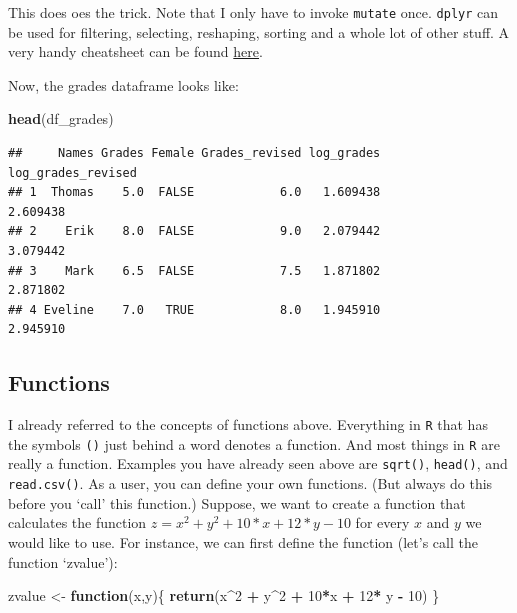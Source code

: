 \documentclass[]{article}
\newenvironment{Shaded}{\begin{snugshade}}{\end{snugshade}}
\newcommand{\KeywordTok}[1]{\textcolor[rgb]{0.13,0.29,0.53}{\textbf{#1}}}
\newcommand{\DecValTok}[1]{\textcolor[rgb]{0.00,0.00,0.81}{#1}}
\newcommand{\StringTok}[1]{\textcolor[rgb]{0.31,0.60,0.02}{#1}}
\newcommand{\ControlFlowTok}[1]{\textcolor[rgb]{0.13,0.29,0.53}{\textbf{#1}}}
\newcommand{\OperatorTok}[1]{\textcolor[rgb]{0.81,0.36,0.00}{\textbf{#1}}}
\newcommand{\NormalTok}[1]{#1}
\theoremstyle{definition}
\theoremstyle{definition}
\theoremstyle{definition}
\theoremstyle{remark}
\begin{document}
This does oes the trick. Note that I only have to invoke \texttt{mutate}
once. \texttt{dplyr} can be used for filtering, selecting, reshaping,
sorting and a whole lot of other stuff. A very handy cheatsheet can be
found
\href{https://www.rstudio.com/wp-content/uploads/2015/02/data-wrangling-cheatsheet.pdf}{here}.

Now, the grades dataframe looks like:

\begin{Shaded}
\begin{Highlighting}[]
\KeywordTok{head}\NormalTok{(df_grades)}
\end{Highlighting}
\end{Shaded}

\begin{verbatim}
##     Names Grades Female Grades_revised log_grades log_grades_revised
## 1  Thomas    5.0  FALSE            6.0   1.609438           2.609438
## 2    Erik    8.0  FALSE            9.0   2.079442           3.079442
## 3    Mark    6.5  FALSE            7.5   1.871802           2.871802
## 4 Eveline    7.0   TRUE            8.0   1.945910           2.945910
\end{verbatim}

\subsection{Functions}\label{functions}

I already referred to the concepts of functions above. Everything in
\texttt{R} that has the symbols \texttt{()} just behind a word denotes a
function. And most things in \texttt{R} are really a function. Examples
you have already seen above are \texttt{sqrt()}, \texttt{head()}, and
\texttt{read.csv()}. As a user, you can define your own functions. (But
always do this before you `call' this function.) Suppose, we want to
create a function that calculates the function
\(z = x^2 + y^2 + 10*x + 12* y - 10\) for every \(x\) and \(y\) we would
like to use. For instance, we can first define the function (let's call
the function `zvalue'):

\begin{Shaded}
\begin{Highlighting}[]
\NormalTok{zvalue <-}\StringTok{ }\ControlFlowTok{function}\NormalTok{(x,y)\{}
  \KeywordTok{return}\NormalTok{(x}\OperatorTok{^}\DecValTok{2} \OperatorTok{+}\StringTok{ }\NormalTok{y}\OperatorTok{^}\DecValTok{2} \OperatorTok{+}\StringTok{ }\DecValTok{10}\OperatorTok{*}\NormalTok{x }\OperatorTok{+}\StringTok{ }\DecValTok{12}\OperatorTok{*}\StringTok{ }\NormalTok{y }\OperatorTok{-}\StringTok{ }\DecValTok{10}\NormalTok{)}
\NormalTok{\}}
\end{Highlighting}
\end{Shaded}
\end{document}

